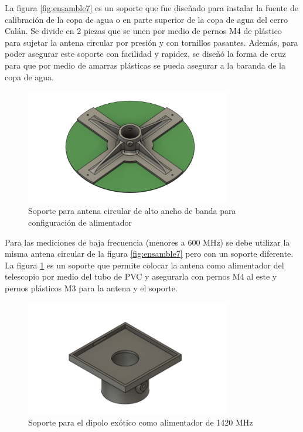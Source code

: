 La figura \ref{fig:ensamble7} es un soporte que fue diseñado para instalar la fuente de calibración de la copa de agua o  en parte superior de la copa de agua del cerro Calán. Se divide en 2 piezas que se unen por medio de pernos M4 de plástico para sujetar la antena circular por presión y con tornillos pasantes. Además, para poder asegurar este soporte con facilidad y rapidez, se diseñó la forma de cruz para que por medio de amarras plásticas se pueda asegurar a la baranda de la copa de agua.\\

\begin{figure}
    \centering
    \includegraphics[width=0.8\textwidth]{img/soporte3D2}
    \caption{Soporte para antena circular de alto ancho de banda para configuración de alimentador}
    \label{fig:ensamble8}
\end{figure}

Para las mediciones de baja frecuencia (menores a 600 MHz) se debe utilizar la misma antena circular de la figura \ref{fig:ensamble7} pero con un soporte diferente. La figura \ref{fig:ensamble8} es un soporte que permite colocar la antena como alimentador del telescopio por medio del tubo de PVC y asegurarla con pernos M4 al este y pernos plásticos M3 para la antena y el soporte.\\

\begin{figure}
    \centering
    \includegraphics[width=0.8\textwidth]{img/soporte3D6}
    \caption{Soporte para el dipolo exótico como alimentador de 1420 MHz}
    \label{fig:ensamble9}
\end{figure}

